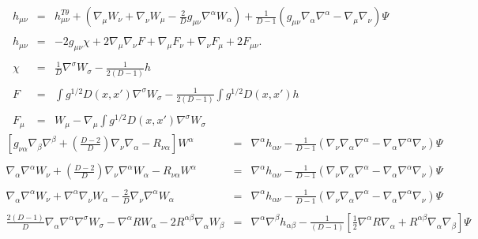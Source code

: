 \documentclass[10pt,letterpaper]{article}
\numberwithin{equation}{section}
\begin{document}
\newpage
\begin{eqnarray}
h_{\mu\nu} &=& h_{\mu\nu}^{T\theta} + \left(\nabla_\mu W_\nu + \nabla_\nu W_\mu - \frac{2}{D}g_{\mu\nu}\nabla^\alpha W_\alpha\right) +\frac{1}{D-1}\left( g_{\mu\nu}\nabla_\alpha \nabla^\alpha - \nabla_\mu\nabla_\nu\right)\Psi
\\  \nonumber\\
h_{\mu\nu} &=& -2g_{\mu\nu}\chi + 2\nabla_\mu\nabla_\nu F + \nabla_\mu F_\nu + \nabla_\nu F_\mu + 2F_{\mu\nu}.
\\ \nonumber\\
\chi &=& \frac{1}{D}\nabla^\sigma W_{\sigma}  - \frac{1}{2(D-1)}h
\\ \nonumber\\
F &=& \int g^{1/2} D(x,x') \nabla^\sigma W_{\sigma}  - \frac{1}{2(D-1)}\int g^{1/2} D(x,x') h
\\ \nonumber\\
F_{\mu} &=& W_{\mu} -\nabla_\mu \int g^{1/2} D(x,x')\nabla^{\sigma}W_\sigma
\end{eqnarray}
\begin{eqnarray}
\left[g_{\nu\alpha}\nabla_\beta\nabla^\beta + \left(\frac{D-2}{D}\right)\nabla_\nu \nabla_\alpha - R_{\nu\alpha}\right]W^\alpha &=&
\nabla^\alpha h_{\alpha\nu} - \frac{1}{D-1}\left(\nabla_\nu \nabla_\alpha\nabla^\alpha - \nabla_\alpha\nabla^\alpha \nabla_\nu\right)
\Psi
\\\nonumber \\
\nabla_\alpha\nabla^\alpha W_\nu + \left(\frac{D-2}{D}\right)\nabla_\nu \nabla^\alpha W_\alpha - R_{\nu\alpha}W^\alpha &=&
\nabla^\alpha h_{\alpha\nu} - \frac{1}{D-1}\left(\nabla_\nu \nabla_\alpha\nabla^\alpha - \nabla_\alpha\nabla^\alpha \nabla_\nu\right)
\Psi
\\\nonumber \\
\nabla_\alpha \nabla^\alpha W_\nu +\nabla^\alpha \nabla_\nu W_\alpha - \frac{2}{D}\nabla_\nu\nabla^\alpha W_\alpha&=&
\nabla^\alpha h_{\alpha\nu} - \frac{1}{D-1}\left(\nabla_\nu \nabla_\alpha\nabla^\alpha - \nabla_\alpha\nabla^\alpha \nabla_\nu\right)
\Psi
\\ \nonumber\\
\frac{2(D-1)}{D}\nabla_\alpha\nabla^\alpha \nabla^\sigma W_\sigma - \nabla^\alpha R W_\alpha - 2R^{\alpha\beta} \nabla_\alpha W_{\beta} &=& 
\nabla^\alpha\nabla^\beta h_{\alpha\beta} - \frac{1}{(D-1)}\left[ \tfrac12 \nabla^\alpha R \nabla_\alpha + R^{\alpha\beta}\nabla_\alpha\nabla_\beta\right]\Psi
\end{eqnarray}
\end{document}
